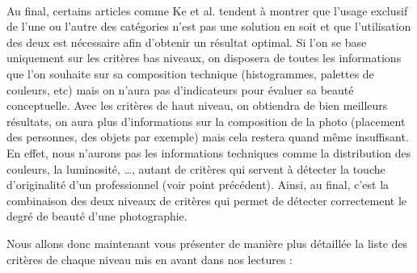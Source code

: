 \documentclass[11pt, french]{report-rd-info}
\begin{document}
\paragraph*{}
Au final, certains articles comme Ke et al. tendent à montrer que l'usage exclusif de l'une ou l'autre des catégories n’est pas une solution en soit et que l’utilisation des deux est nécessaire afin d’obtenir un résultat optimal. Si l’on se base uniquement sur les critères bas niveaux, on disposera de toutes les informations que l’on souhaite sur sa composition technique (histogrammes, palettes de couleurs, etc) mais on n’aura pas d’indicateurs pour évaluer sa beauté conceptuelle. Avec les critères de haut niveau, on obtiendra de bien meilleurs résultats, on aura plus d’informations sur la composition de la photo (placement des personnes, des objets par exemple) mais cela restera quand même insuffisant. En effet, nous n’aurons pas les informations techniques comme la distribution des couleurs, la luminosité, \ldots, autant de critères qui servent à détecter la touche d’originalité d’un professionnel (voir point précédent).
Ainsi, au final, c’est la combinaison des deux niveaux de critères qui permet de détecter correctement le degré de beauté d’une photographie.


Nous allons donc maintenant vous présenter de manière plus détaillée la liste des critères de chaque niveau mis en avant dans nos lectures :
\end{document}
